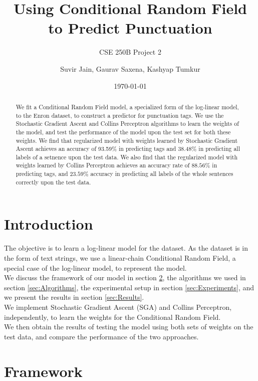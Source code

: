 \documentclass[11pt,a4paper,oneside]{article}
\title{Using Conditional Random Field to Predict Punctuation}
\subtitle{CSE 250B Project 2}
\author{Suvir Jain, Gaurav Saxena, Kashyap Tumkur}
\date{\today}
\begin{document}
\maketitle

\begin{abstract}
We fit a Conditional Random Field model, a specialized form of the log-linear model, to the Enron dataset, to construct a predictor for punctuation tags. We use the Stochastic Gradient Ascent and Collins Perceptron algorithms to learn the weights of the model, and test the performance of the model upon the test set for both these weights. We find that regularized model with weights learned by Stochastic Gradient Ascent achieves an accuracy of 93.59\% in predicting tags and 38.48\% in predicting all labels of a setnence upon the test data. We also find that the regularized model with weights learned by Collins Perceptron achieves an accuracy rate of $88.56\%$ in predicting tags, and $23.59\%$ accuracy in predicting all labels of the whole sentences correctly upon the test data.
\end{abstract}

\section{Introduction}

The objective is to learn a log-linear model for the dataset. As the dataset is in the form of text strings, we use a linear-chain Conditional Random Field, a special case of the log-linear model, to represent the model. \\

We discuss the framework of our model in section \ref{sec:Framework}, the algorithms we used in section \ref{sec:Algorithms}, the experimental setup in section \ref{sec:Experiments}, and we present the results in section \ref{sec:Results}.\\

We implement Stochastic Gradient Ascent (SGA) and Collins Perceptron, independently, to learn  the weights for the Conditional Random Field.\\

We then obtain the results of testing the model using both sets of weights on the test data, and compare the performance of the two approaches.

\section{Framework}
\label{sec:Framework}
\end{document}
